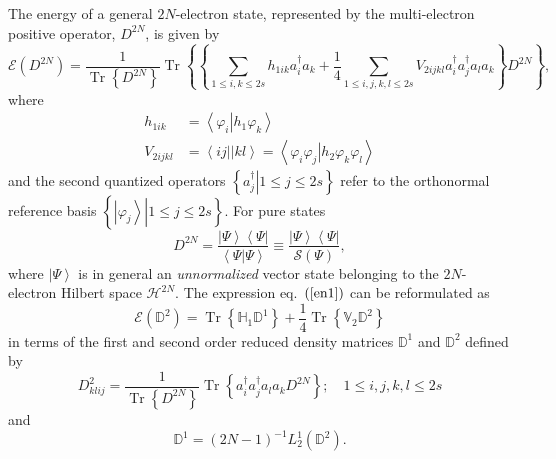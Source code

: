 \documentclass[aps,preprint]{revtex4}%
\begin{document}
The energy of a general $2N$-electron state, represented by the multi-electron
positive operator, $D^{2N}$, is given by
\begin{equation}
\mathcal{E}\left(  D^{2N}\right)  =\frac{1}{\operatorname{Tr}\left\{
D^{2N}\right\}  }\operatorname{Tr}\left\{  \left\{  \sum_{1\leq i,k\leq
2s}h_{1ik}a_{i}^{\dagger}a_{k}+\frac{1}{4}\sum_{1\leq i,j,k,l\leq2s}%
V_{2ijkl}a_{i}^{\dagger}a_{j}^{\dagger}a_{l}a_{k}\right\}  D^{2N}\right\}  ,
\label{en1}%
\end{equation}
where
\begin{align}
h_{1ik}  &  =\left\langle \varphi_{i}\left\vert h_{1}\varphi_{k}\right.
\right\rangle \nonumber\\
V_{2ijkl}  &  =\left\langle ij||kl\right\rangle =\left\langle \varphi
_{i}\varphi_{j}\left\vert h_{2}\varphi_{k}\varphi_{l}\right.  \right\rangle
\end{align}
and the second quantized operators $\left\{  \left.  a_{j}^{\dagger
}\right\vert 1\leq j\leq2s\right\}  $ refer to the orthonormal reference basis
$\left\{  \left.  \left\vert \varphi_{j}\right\rangle \right\vert 1\leq
j\leq2s\right\}  $. For pure states
\begin{equation}
D^{2N}=\frac{\left\vert \Psi\right\rangle \left\langle \Psi\right\vert
}{\left\langle \Psi\left\vert \Psi\right.  \right\rangle }\equiv
\frac{\left\vert \Psi\right\rangle \left\langle \Psi\right\vert }%
{\mathcal{S}\left(  \Psi\right)  },
\end{equation}
where $\left\vert \Psi\right\rangle $ is in general an \emph{unnormalized
}vector\emph{ }state belonging to the $2N$-electron Hilbert space
$\mathcal{H}^{2N}.$ The expression eq.\ $\left(  \ref{en1}\right)  $ can be
reformulated as
\begin{equation}
\mathcal{E}\left(  \mathbb{D}^{2}\right)  =\operatorname{Tr}\left\{
\mathbb{H}_{1}\mathbb{D}^{1}\right\}  +\frac{1}{4}\operatorname{Tr}\left\{
\mathbb{V}_{2}\mathbb{D}^{2}\right\}
\end{equation}
in terms of the first and second order reduced density matrices $\mathbb{D}%
^{1}$ and $\mathbb{D}^{2}$ defined by
\begin{equation}
D_{klij}^{2}=\frac{1}{\operatorname{Tr}\left\{  D^{2N}\right\}  }%
\operatorname{Tr}\left\{  a_{i}^{\dagger}a_{j}^{\dagger}a_{l}a_{k}%
D^{2N}\right\}  ;\quad1\leq i,j,k,l\leq2s
\end{equation}
and
\begin{equation}
\mathbb{D}^{1}=\left(  2N-1\right)  ^{-1}L_{2}^{1}\left(  \mathbb{D}%
^{2}\right)  .
\end{equation}
\end{document}
